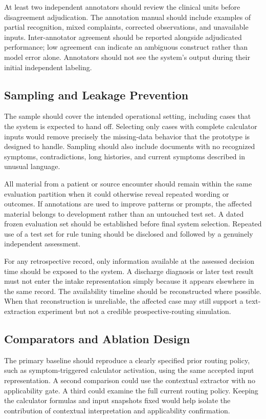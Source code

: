 \documentclass[conference]{IEEEtran}
\begin{document}
At least two independent annotators should review the clinical units before disagreement adjudication. The annotation manual should include examples of partial recognition, mixed complaints, corrected observations, and unavailable inputs. Inter-annotator agreement should be reported alongside adjudicated performance; low agreement can indicate an ambiguous construct rather than model error alone. Annotators should not see the system's output during their initial independent labeling.

\subsection{Sampling and Leakage Prevention}
The sample should cover the intended operational setting, including cases that the system is expected to hand off. Selecting only cases with complete calculator inputs would remove precisely the missing-data behavior that the prototype is designed to handle. Sampling should also include documents with no recognized symptoms, contradictions, long histories, and current symptoms described in unusual language.

All material from a patient or source encounter should remain within the same evaluation partition when it could otherwise reveal repeated wording or outcomes. If annotations are used to improve patterns or prompts, the affected material belongs to development rather than an untouched test set. A dated frozen evaluation set should be established before final system selection. Repeated use of a test set for rule tuning should be disclosed and followed by a genuinely independent assessment.

For any retrospective record, only information available at the assessed decision time should be exposed to the system. A discharge diagnosis or later test result must not enter the intake representation simply because it appears elsewhere in the same record. The availability timeline should be reconstructed where possible. When that reconstruction is unreliable, the affected case may still support a text-extraction experiment but not a credible prospective-routing simulation.

\subsection{Comparators and Ablation Design}
The primary baseline should reproduce a clearly specified prior routing policy, such as symptom-triggered calculator activation, using the same accepted input representation. A second comparison could use the contextual extractor with no applicability gate. A third could examine the full current routing policy. Keeping the calculator formulas and input snapshots fixed would help isolate the contribution of contextual interpretation and applicability confirmation.
\end{document}
